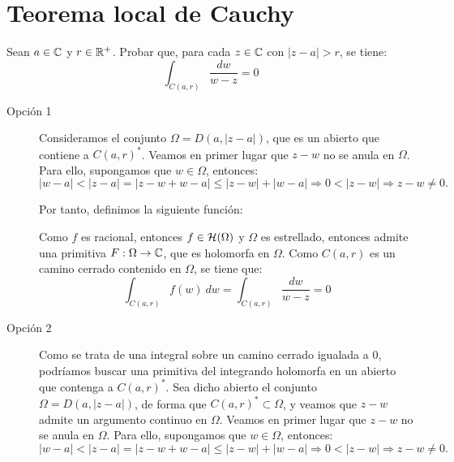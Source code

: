 \section{Teorema local de Cauchy}

\begin{ejercicio}\label{ej:7.1}
    Sean $a \in \mathbb{C}$ y $r \in \mathbb{R}^+$. Probar que, para cada $z \in \mathbb{C}$ con $|z-a| > r$, se tiene:
    \[
        \int_{C(a,r)} \frac{dw}{w-z} = 0
    \]
    \begin{description}
        \item[Opción 1] Consideramos el conjunto $\Omega=D(a,|z-a|)$, que es un abierto que contiene a $C(a,r)^*$. Veamos en primer lugar que $z-w$ no se anula en $\Omega$. Para ello, supongamos que $w \in \Omega$, entonces:
        \begin{equation*}
            |w-a| < |z-a|=|z-w+w-a| \leq |z-w|+|w-a| \Longrightarrow 0<|z-w|\Longrightarrow z-w\neq 0.
        \end{equation*}

        Por tanto, definimos la siguiente función:

        Como $f$ es racional, entonces $f\in \mathcal{H}(\Omega)$ y $\Omega$ es estrellado, entonces admite una primitiva $F:\Omega\to \mathbb{C}$, que es holomorfa en $\Omega$. Como $C(a,r)$ es un camino cerrado contenido en $\Omega$, se tiene que:
        \begin{equation*}
            \int_{C(a,r)} f(w) \ dw = \int_{C(a,r)} \dfrac{dw}{w-z} = 0
        \end{equation*}
        

        \item[Opción 2] Como se trata de una integral sobre un camino cerrado igualada a $0$, podríamos buscar una primitiva del integrando holomorfa en un abierto que contenga a $C(a,r)^*$. Sea dicho abierto el conjunto $\Omega=D(a,|z-a|)$, de forma que $C(a,r)^* \subset \Omega$, y veamos que $z-w$ admite un argumento continuo en $\Omega$. Veamos en primer lugar que $z-w$ no se anula en $\Omega$. Para ello, supongamos que $w \in \Omega$, entonces:
        \begin{equation*}
            |w-a| < |z-a|=|z-w+w-a| \leq |z-w|+|w-a| \Longrightarrow 0<|z-w|\Longrightarrow z-w\neq 0.
        \end{equation*}


\end{description}
\end{ejercicio}
